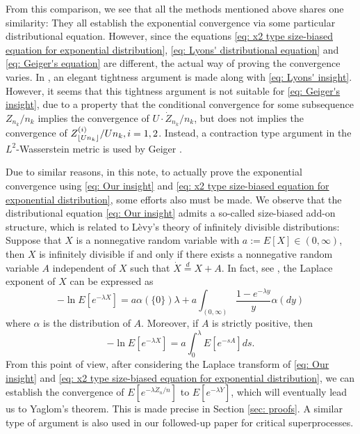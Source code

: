 \documentclass[12pt,a4paper]{amsart}
\DeclarePairedDelimiter\floor{\lfloor}{\rfloor}
\numberwithin{equation}{section}
\begin{document}
	From this comparison, we see that all the methods mentioned above shares one similarity: They all establish the exponential convergence via some particular distributional equation.
	However, since the equations \eqref{eq: x2 type size-biased equation for exponential distribution}, \eqref{eq: Lyons' distributional equation} and \eqref{eq: Geiger's equation} are different, the actual way of proving the convergence varies.
	In \cite{lyons1995conceptual}, an elegant tightness argument is made along with \eqref{eq: Lyons' insight}.
	However, it seems that this tightness argument is not suitable for \eqref{eq: Geiger's insight}, due to a property that the conditional convergence for some subsequence $Z_{n_k}/n_k$ implies the convergence of $U \cdot \dot Z_{n_k}/n_k$, 
   	but does not implies the convergence of $Z^{(i)}_{ \floor{Un_k}}/Un_k, i=1, 2$.
	Instead, a contraction type argument in the $L^2$-Wasserstein metric is used by Geiger \cite{geiger2000new}.
	
	Due to similar reasons, in this note,
	to actually prove the exponential convergence using \eqref{eq: Our insight} and \eqref{eq: x2 type size-biased equation for exponential distribution}, some efforts also must be made.
	We observe that the distributional equation \eqref{eq: Our insight} admits 
    a so-called size-biased add-on structure, which is related to L\`evy's 
	theory of infinitely divisible distributions: Suppose that $X$ is a nonnegative random variable with $ a := E [X]\in (0,\infty)$,
	then $X$ is infinitely divisible if and only if there exists a nonnegative random variable $A$ independent of $X$ such that $\dot X 	\overset{d} = X + A$.
	In fact, see \cite[Theorem 10.1]{ArratiaGoldsteinKochman2013}, the Laplace exponent of $X$ can be expressed as
\[
	-\ln E[ e^{-\lambda X}]
	 =  a \alpha(\{0\}) \lambda+ a \int_{(0,\infty)} \frac{1 - e^{-\lambda y}}{y} \alpha(dy)
\]
	where $\alpha$ is the distribution of $A$.
	Moreover, if $A$ is strictly positive, then
\begin{equation}\label{eq: Laplace exponent for size-biased add-on equation}
	-\ln E[ e^{-\lambda X}]
	=  a  \int_0^\lambda E [e^{-s A}] ds.
\end{equation}
	From this point of view, after considering the Laplace transform of \eqref{eq: Our insight} and \eqref{eq: x2 type size-biased equation for exponential distribution}, we can establish the convergence of $E[e^{-\lambda \dot Z_n/n}]$ to $E[e^{-\lambda \dot {Y}}]$, which will eventually lead us to Yaglom's theorem.
	This is made precise in Section \ref{sec: proofs}.
	A similar type of argument is also  used in our followed-up paper \cite{RenSongSun2017Spine} %
	for critical superprocesses.
	
\end{document}
